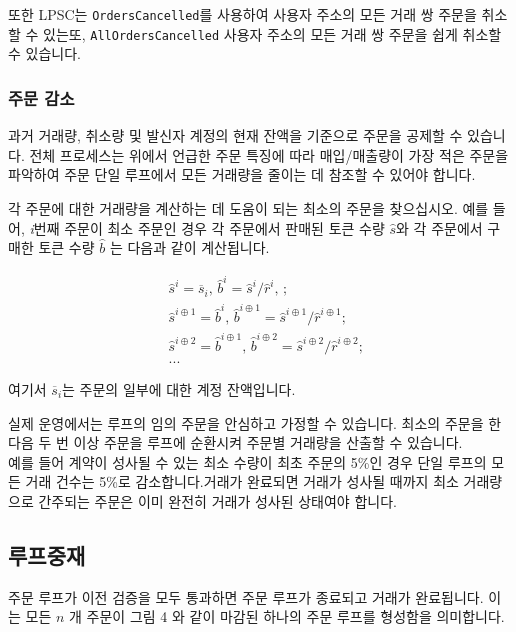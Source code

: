 \documentclass{article}
\begin{document}
\begin{multicols}{2}
\indent 또한 LPSC는 \verb|OrdersCancelled|를 사용하여 사용자 주소의 모든 거래 쌍 주문을 취소할 수 있는또, \verb|AllOrdersCancelled| 사용자 주소의 모든 거래 쌍 주문을 쉽게 취소할 수 있습니다. 

\subsubsection{주문 감소\label{sec:order_scaling}}
\indent 과거 거래량, 취소량 및 발신자 계정의 현재 잔액을 기준으로 주문을 공제할 수 있습니다. 전체 프로세스는 위에서 언급한 주문 특징에 따라 매입/매출량이 가장 적은 주문을 파악하여 주문 단일 루프에서 모든 거래량을 줄이는 데 참조할 수 있어야 합니다.

\indent 각 주문에 대한 거래량을 계산하는 데 도움이 되는 최소의 주문을 찾으십시오. 예를 들어, \textit{i}번째 주문이 최소 주문인 경우 각 주문에서 판매된 토큰 수량 $\hat{s}$와 각 주문에서 구매한 토큰 수량 $\hat{b}$ 는 다음과 같이 계산됩니다.

\[
\begin{split}
&\hat{s}^{i}=\overline{s}_i\text{, } \hat{b}^{i}=\hat{s}^{i}/ \hat{r}^i\text{, }\text{;}\\
&\hat{s}^{i\oplus 1}=\hat{b}^i\text{, } \hat{b}^{i\oplus 1}=\hat{s}^{i\oplus 1}/ \hat{r}^{i\oplus 1}\text{;}\\
&\hat{s}^{i\oplus 2}=\hat{b}^{i\oplus 1}\text{, } \hat{b}^{i\oplus 2}=\hat{s}^{i\oplus 2}/ \hat{r}^{i\oplus 2}\text{;}\\
& ...
\end{split}
\]

여기서 $\overline{s}_i$는 주문의 일부에 대한 계정 잔액입니다.

\indent 실제 운영에서는 루프의 임의 주문을 안심하고 가정할 수 있습니다. 최소의 주문을 한 다음 두 번 이상 주문을 루프에 순환시켜 주문별 거래량을 산출할 수 있습니다.\\
\indent 예를 들어 계약이 성사될 수 있는 최소 수량이 최초 주문의 5\%인 경우 단일 루프의 모든 거래 건수는 5\%로 감소합니다.거래가 완료되면 거래가 성사될 때까지 최소 거래량으로 간주되는 주문은 이미 완전히 거래가 성사된 상태여야 합니다.

\subsection{루프중재\label{sec:settlement}}

\indent 주문 루프가 이전 검증을 모두 통과하면 주문 루프가 종료되고 거래가 완료됩니다. 이는 모든 $n$ 개 주문이 그림 4 와 같이 마감된 하나의 주문 루프를 형성함을 의미합니다.


\end{multicols}
\end{document}
